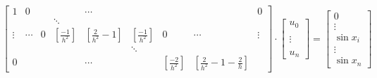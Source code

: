\documentclass[12pt,a4paper]{mwart}
\begin{document}
\begin{align*}
    \left[
    \begin{matrix}
        1 & 0 & & & \cdots & & & & 0 \\
        & & & \ddots & \\
        \vdots & \cdots & 0 & \left[\frac{-1}{h^2}\right] & \left[\frac{2}{h^2}-1\right] & \left[\frac{-1}{h^2}\right] & 0 & \cdots & \vdots \\
        & & & & & \ddots & \\
        0 & & & & \cdots & & \left[\frac{-2}{h^2}\right] & \left[\frac{2}{h^2}-1-\frac{2}{h}\right]
    \end{matrix}
    \right]
    \cdot
    \left[
    \begin{matrix}
        u_0 \\
        \\
        \vdots \\
        \\
        u_n
    \end{matrix}
    \right]
    =
    \left[
    \begin{matrix}
        0 \\
        \vdots \\
        \sin x_i \\
        \vdots \\
        \sin x_n
    \end{matrix}
    \right]
\end{align*}
\end{document}
